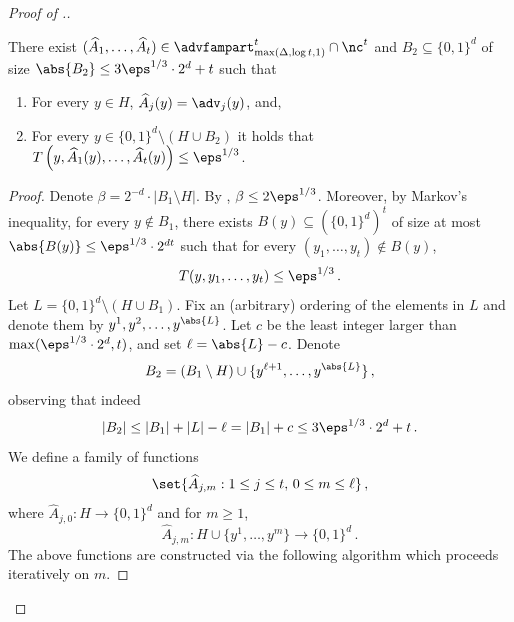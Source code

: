 \begin{proof}[Proof of .]
\begin{proposition}\label{c: pi construction}
There exist $(\widehat{A}_1,\ldots,\widehat{A}_t) \in  \advfampart^t_{\max(\Delta, \log t,1)} \cap \nc^t$ and $B_2 \subseteq \{0,1\}^d$ of size $\abs{B_2} \le 3\eps^{1/3}\cdot 2^d + t$ such that
\begin{enumerate}
  \item\label{it:c1} For every $y \in H$, $\widehat{A}_j(y) = \adv_j(y)$, and,
  \item\label{it:c2} For every $y \in \{0,1\}^d \setminus (H \cup B_2)$ it holds that $T\left(y,\widehat{A}_1(y), \ldots, \widehat{A}_t(y)\right) \le \eps^{1/3}$.
\end{enumerate}
\end{proposition}

\begin{proof}

Denote $\beta = 2^{-d} \cdot |B_1\setminus H|$. 
By , $\beta \leq 2\eps^{1/3}$. Moreover, by Markov's inequality, for every $y \notin B_1$, there exists $B(y) \subseteq (\{0,1\}^d)^t$ of size at most $\abs{B(y)} \leq  \eps^{1/3} \cdot 2^{dt}$ such that for every $(y_1,\ldots,y_t) \notin B(y)$, \[T(y,y_1,\ldots,y_t) \le \eps^{1/3}\,.\]
Let $L = \{0,1\}^d \setminus (H \cup B_1)$. Fix an (arbitrary) ordering of the elements in $L$ and denote them by $y^1,y^2,\ldots,y^{\abs{L}}$. Let $c$ be the least integer larger than $\max(\eps^{1/3} \cdot 2^d, t)$, and set $\ell = \abs{L} - c$. Denote \[B_2 = (B_1\setminus H) \cup \{y^{\ell+1},\ldots, y^{\abs{L}}\}\,,\] observing that indeed
\[
|B_2| \le |B_1| + |L|-\ell = |B_1| +c \le 3\eps^{1/3}\cdot 2^d + t\,.
\]
%
We define a family of functions
\[
\set{\widehat{A}_{j,m} : 1 \le j \le t,\, 0 \le m \le \ell}\,,
\]
where $\widehat{A}_{j,0} \colon H  \rightarrow \{0,1\}^d$ and for $m \ge 1$,
\[\widehat{A}_{j,m} \colon H \cup \{y^1,\ldots, y^{m}\} \rightarrow \{0,1\}^d\,.\]
The above functions are constructed via the following algorithm which proceeds iteratively on $m$.%

%

\end{proof}
\end{proof}
